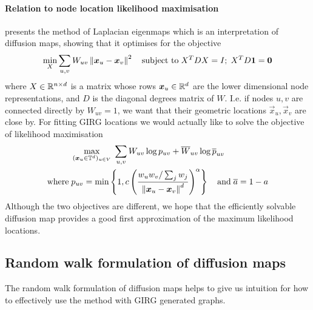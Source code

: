 \paragraph{Relation to node location likelihood maximisation}
\cite{belkin2001laplacian} presents the method of Laplacian eigenmaps which is an interpretation of diffusion maps, showing that it optimises for the objective
\begin{equation}
  \min_{X} \sum_{u, v} W_{uv} \left\lVert \bm{x}_u - \bm{x}_v\right\rVert^2 \quad \text{subject to}\; X^T D X = I;\; X^T D\bm{1} = \bm{0} 
\end{equation}
where $X \in \mathbb{R}^{n \times d}$ is a  matrix whose rows $\bm{x}_u \in \mathbb{R}^d$ are the lower dimensional node representations, and $D$ is the diagonal degrees matrix of $W$. I.e. if nodes $u, v$ are connected directly by $W_{uv} = 1$, we want that their geometric locations $\vec{x}_u, \vec{x}_v$ are close by.
For fitting GIRG locations we would actually like to solve the objective of likelihood maximisation
\begin{align}
  &\max\limits_{(\bm{x}_u \in \mathbb{T}^d)_{u \in V}} \;
  \sum_{u, v} W_{uv} \log p_{uv} + \overline{W}_{uv} \log \overline{p}_{uv}
  \\
  \text{where}\;
  &p_{uv} = \min \left \{
    1, c \left ( \frac{w_u w_v / \sum_j w_j}{\left\lVert \bm{x}_u - \bm{x}_v\right\rVert^d} \right )^\alpha
  \right \}
  \quad \text{and}\;
  \overline{a} = 1 - a
\end{align}
Although the two objectives are different, we hope that the efficiently solvable diffusion map provides a good first approximation of the maximum likelihood locations.




\subsection{Random walk formulation of diffusion maps}
\label{sec:diff_maps_theory}
The random walk formulation of diffusion maps helps to give us intuition for how to effectively use the method with GIRG generated graphs.

